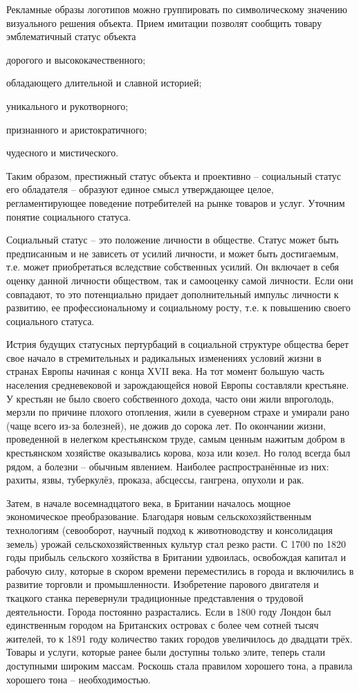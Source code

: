 Рекламные образы логотипов можно группировать по символическому значению
визуального решения
объекта.\autocite[][107]{pavlovskaya2003design} Прием имитации позволят сообщить
товару эмблематичный статус объекта
\begin{enumerate*}[label=\asbuk*)]
\item дорогого и высококачественного;
\item обладающего длительной и славной историей;
\item уникального и рукотворного;
\item признанного и аристократичного;
\item чудесного и мистического.
\end{enumerate*}
Таким образом, престижный статус объекта и проективно -- социальный статус его
обладателя -- образуют единое смысл утверждающее целое, регламентирующее
поведение потребителей на рынке товаров и услуг. Уточним понятие социального
статуса.

Социальный статус -- это положение личности в обществе. Статус может быть
предписанным и не зависеть от усилий личности, и может быть достигаемым, т.е.
может приобретаться вследствие собственных усилий. Он включает в себя оценку
данной личности обществом, так и самооценку самой личности. Если они совпадают,
то это потенциально придает дополнительный импульс личности к развитию, ее
профессиональному и социальному росту, т.е. к повышению своего социального
статуса.

Истрия будущих статусных пертурбаций в социальной структуре общества берет свое
начало в стремительных и радикальных изменениях условий жизни в странах Европы
начиная с конца ХVII века. На тот момент большую часть населения средневековой
и зарождающейся новой Европы составляли крестьяне. У крестьян не было своего
собственного дохода, часто они жили впроголодь, мерзли по причине плохого
отопления,  жили в суеверном страхе и умирали  рано (чаще всего из-за болезней),
не дожив до сорока лет. По окончании жизни, проведенной в нелегком крестьянском
труде, самым ценным нажитым добром в крестьянском хозяйстве оказывались корова,
коза или козел. Но голод всегда был рядом, а болезни -- обычным явлением.
Наиболее распространённые из них: рахиты, язвы, туберкулёз, проказа, абсцессы,
гангрена, опухоли и рак.

Затем, в начале восемнадцатого века, в Британии началось мощное экономическое
преобразование. Благодаря новым сельскохозяйственным технологиям (севооборот,
научный подход к животноводству и консолидация земель) урожай
сельскохозяйственных культур стал резко расти. С 1700 по 1820 годы прибыль
сельского хозяйства в Британии удвоилась, освобождая капитал и рабочую силу,
которые в скором времени переместились в города и включились в развитие торговли
и промышленности. Изобретение парового двигателя и ткацкого станка перевернули
традиционные представления о трудовой деятельности. Города постоянно
разрастались. Если в 1800 году Лондон был единственным городом на Британских
островах с более чем сотней тысяч жителей, то к 1891 году количество таких
городов увеличилось до двадцати трёх. Товары и услуги, которые ранее были
доступны только элите, теперь стали доступными широким массам. Роскошь стала
правилом хорошего тона, а правила хорошего тона -- необходимостью.

